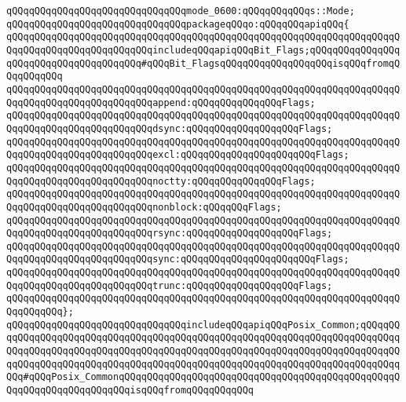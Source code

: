 \verb|qQQqqQQqqQQqqQQqqQQqqQQqqQQqqQQqmode_0600:qQQqqQQqqQQqs::Mode;|\newline
\newline
\verb|qQQqqQQqqQQqqQQqqQQqqQQqqQQqqQQqpackageqQQqo:qQQqqQQqapiqQQq{|\newline
\verb|qQQqqQQqqQQqqQQqqQQqqQQqqQQqqQQqqQQqqQQqqQQqqQQqqQQqqQQqqQQqqQQqqQQqqQQqqQQqqQQqqQQqqQQqqQQqqQQqincludeqQQqapiqQQqBit_Flags;qQQqqQQqqQQqqQQqqQQqqQQqqQQqqQQqqQQqqQQq#qQQqBit_FlagsqQQqqQQqqQQqqQQqqQQqisqQQqfromqQQqqQQqqQQq|\newline
\newline
\verb|qQQqqQQqqQQqqQQqqQQqqQQqqQQqqQQqqQQqqQQqqQQqqQQqqQQqqQQqqQQqqQQqqQQqqQQqqQQqqQQqqQQqqQQqqQQqqQQqappend:qQQqqQQqqQQqqQQqFlags;|\newline
\verb|qQQqqQQqqQQqqQQqqQQqqQQqqQQqqQQqqQQqqQQqqQQqqQQqqQQqqQQqqQQqqQQqqQQqqQQqqQQqqQQqqQQqqQQqqQQqqQQqdsync:qQQqqQQqqQQqqQQqqQQqFlags;|\newline
\verb|qQQqqQQqqQQqqQQqqQQqqQQqqQQqqQQqqQQqqQQqqQQqqQQqqQQqqQQqqQQqqQQqqQQqqQQqqQQqqQQqqQQqqQQqqQQqqQQqexcl:qQQqqQQqqQQqqQQqqQQqqQQqFlags;|\newline
\verb|qQQqqQQqqQQqqQQqqQQqqQQqqQQqqQQqqQQqqQQqqQQqqQQqqQQqqQQqqQQqqQQqqQQqqQQqqQQqqQQqqQQqqQQqqQQqqQQqnoctty:qQQqqQQqqQQqqQQqFlags;|\newline
\verb|qQQqqQQqqQQqqQQqqQQqqQQqqQQqqQQqqQQqqQQqqQQqqQQqqQQqqQQqqQQqqQQqqQQqqQQqqQQqqQQqqQQqqQQqqQQqqQQqnonblock:qQQqqQQqFlags;|\newline
\verb|qQQqqQQqqQQqqQQqqQQqqQQqqQQqqQQqqQQqqQQqqQQqqQQqqQQqqQQqqQQqqQQqqQQqqQQqqQQqqQQqqQQqqQQqqQQqqQQqrsync:qQQqqQQqqQQqqQQqqQQqFlags;|\newline
\verb|qQQqqQQqqQQqqQQqqQQqqQQqqQQqqQQqqQQqqQQqqQQqqQQqqQQqqQQqqQQqqQQqqQQqqQQqqQQqqQQqqQQqqQQqqQQqqQQqsync:qQQqqQQqqQQqqQQqqQQqqQQqFlags;|\newline
\verb|qQQqqQQqqQQqqQQqqQQqqQQqqQQqqQQqqQQqqQQqqQQqqQQqqQQqqQQqqQQqqQQqqQQqqQQqqQQqqQQqqQQqqQQqqQQqqQQqtrunc:qQQqqQQqqQQqqQQqqQQqFlags;|\newline
\newline
\verb|qQQqqQQqqQQqqQQqqQQqqQQqqQQqqQQqqQQqqQQqqQQqqQQqqQQqqQQqqQQqqQQqqQQqqQQqqQQqqQQq};|\newline
\newline
\verb|qQQqqQQqqQQqqQQqqQQqqQQqqQQqqQQqincludeqQQqapiqQQqPosix_Common;qQQqqQQqqQQqqQQqqQQqqQQqqQQqqQQqqQQqqQQqqQQqqQQqqQQqqQQqqQQqqQQqqQQqqQQqqQQqqQQqqQQqqQQqqQQqqQQqqQQqqQQqqQQqqQQqqQQqqQQqqQQqqQQqqQQqqQQqqQQqqQQqqQQqqQQqqQQqqQQqqQQqqQQqqQQqqQQqqQQqqQQqqQQqqQQqqQQqqQQqqQQqqQQqqQQqqQQqqQQq#qQQqPosix_CommonqQQqqQQqqQQqqQQqqQQqqQQqqQQqqQQqqQQqqQQqqQQqqQQqqQQqqQQqqQQqqQQqqQQqqQQqisqQQqfromqQQqqQQqqQQq|\newline
